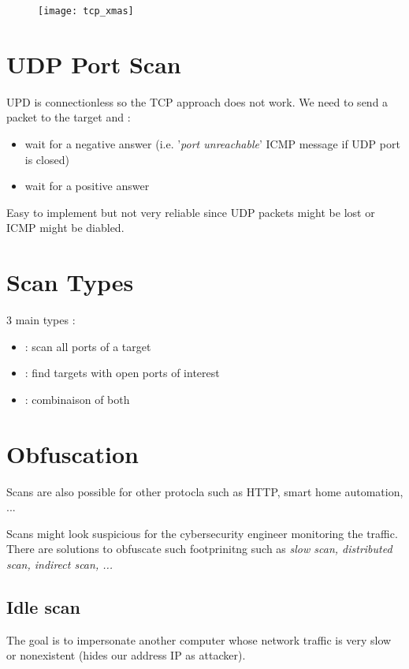 \begin{figure}[H]
    \centering
    \texttt{[image: tcp\_xmas]}
\end{figure}

\section{UDP Port Scan}

UPD is connectionless so the TCP approach does not work. We need to send a packet to the target and :
\begin{itemize}
    \item wait for a negative answer (i.e. '\textit{port unreachable}' ICMP message if UDP port is closed)
    \item wait for a positive answer
\end{itemize}

Easy to implement but not very reliable since UDP packets might be lost or ICMP might be diabled.

\section{Scan Types}

3 main types :
\begin{itemize}
    \item {} : scan all ports of a target
    \item {} : find targets with open ports of interest
    \item {} : combinaison of both
\end{itemize}

\section{Obfuscation}

Scans are also possible for other protocla such as HTTP, smart home automation, ...

Scans might look suspicious for the cybersecurity engineer monitoring the traffic. There are solutions to obfuscate such footprinitng such as \textit{slow scan, distributed scan, indirect scan, ...}

\subsection{Idle scan}

The goal is to impersonate another computer whose network traffic is very slow or nonexistent (hides our address IP as attacker).

